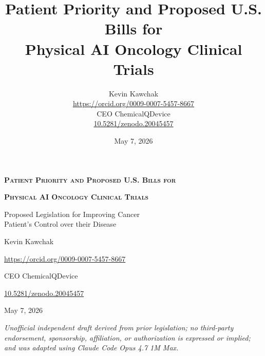 \documentclass[11pt,letterpaper]{article}
\title{Patient Priority and Proposed U.S. Bills for\\
Physical AI Oncology Clinical Trials}
\author{%
  Kevin Kawchak\\
  \href{https://orcid.org/0009-0007-5457-8667}{https://orcid.org/0009-0007-5457-8667}\\
  CEO ChemicalQDevice\\
  \href{https://doi.org/10.5281/zenodo.20045457}{10.5281/zenodo.20045457}
}
\date{May 7, 2026}
\newcommand{\subtitlestr}{Proposed Legislation for Improving Cancer\\Patient's Control over their Disease}
\begin{document}
\thispagestyle{empty}

\begin{center}
\vspace*{0.4in}

{\LARGE\bfseries\scshape Patient Priority and Proposed U.S. Bills for\par}
{\LARGE\bfseries\scshape Physical AI Oncology Clinical Trials\par}

\vspace{0.35in}

{\large \subtitlestr\par}

\vspace{0.40in}

{\normalsize Kevin Kawchak\par}

\vspace{0.10in}

{\normalsize \href{https://orcid.org/0009-0007-5457-8667}{https://orcid.org/0009-0007-5457-8667}\par}

\vspace{0.10in}

{\normalsize CEO ChemicalQDevice\par}

\vspace{0.10in}

{\normalsize \href{https://doi.org/10.5281/zenodo.20045457}{10.5281/zenodo.20045457}\par}

\vspace{0.10in}

{\normalsize May 7, 2026\par}

\vspace{0.30in}
\end{center}

\begin{center}
\footnotesize
\textit{Unofficial independent draft derived from prior legislation; no
third-party endorsement, sponsorship, affiliation, or authorization is
expressed or implied; and was adapted using Claude Code Opus 4.7 1M Max.}
\end{center}
\end{document}
